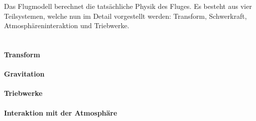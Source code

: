 Das Flugmodell berechnet die tatsächliche Physik des Fluges. Es besteht aus vier Teilsystemen, welche nun im Detail vorgestellt werden: Transform, Schwerkraft, Atmosphäreninteraktion und Triebwerke. \\ \\

\paragraph{Transform}


\paragraph{Gravitation}


\paragraph{Triebwerke}


\paragraph{Interaktion mit der Atmosphäre}
